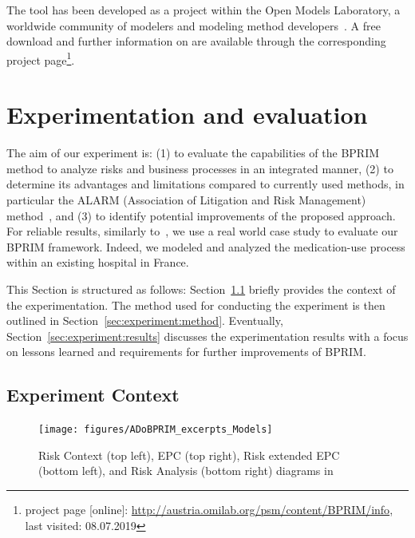 \documentclass[preprint,3p,times,number]{elsarticle}
\begin{document}
The tool has been developed as a project within the Open Models Laboratory, a worldwide community of modelers and modeling method developers~\cite{Bork:2019omilab}. A free download and further information on \adobprim{} are available through the corresponding project page\footnote{\adobprim{} project page [online]: \url{http://austria.omilab.org/psm/content/BPRIM/info}, last visited: 08.07.2019}.

\section{Experimentation and evaluation}
\label{sec:evaluation}
The aim of our experiment is: (1) to evaluate the capabilities of the BPRIM method to analyze risks and business processes in an integrated manner, (2) to determine its advantages and limitations compared to currently used methods, in particular the ALARM (Association of Litigation and Risk Management) method~\cite{vincent2000}, and (3) to identify potential improvements of the proposed approach. For reliable results, similarly to~\cite{barcelona2018}, we use a real world case study to evaluate our BPRIM framework. Indeed, we modeled and analyzed the medication-use process within an existing hospital in France.

This Section is structured as follows: Section~\ref{sec:experiment:context} briefly provides the context of the experimentation. The method used for conducting the experiment is then outlined in Section~\ref{sec:experiment:method}. Eventually, Section~\ref{sec:experiment:results} discusses the experimentation results with a focus on lessons learned and requirements for further improvements of BPRIM.

\subsection{Experiment Context}
\label{sec:experiment:context}

\begin{figure}[!ht]
 \begin{center}
    \texttt{[image: figures/ADoBPRIM\_excerpts\_Models]}
    \caption{Risk Context (top left), EPC (top right), Risk extended EPC (bottom left), and Risk Analysis (bottom right) diagrams in \adobprim{}}
    \label{fig:AdoBPRIM_use}
 \end{center}
\end{figure}
\end{document}
